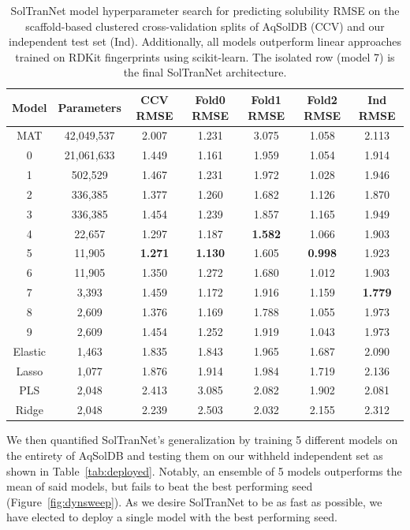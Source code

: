 \documentclass[journal=jmcmar,manuscript=article]{achemso}
\begin{document}
\begin{table}
    \begin{tabular}{|c|c|c|c|c|c|c|}
        \hline
         Model & Parameters & CCV RMSE & Fold0 RMSE & Fold1 RMSE & Fold2 RMSE & Ind RMSE \\
         \hline
         MAT & 42,049,537 & 2.007 & 1.231 & 3.075 & 1.058 & 2.113  \\
         \hline
         0 & 21,061,633 & 1.449 & 1.161 & 1.959 & 1.054 & 1.914 \\
         1 & 502,529 & 1.467 & 1.231 & 1.972 & 1.028 & 1.946 \\
         2 & 336,385 & 1.377 & 1.260 & 1.682 & 1.126 & 1.870 \\
         3 & 336,385 & 1.454 & 1.239 & 1.857 & 1.165 & 1.949 \\
         4 & 22,657 & 1.297 & 1.187 & \textbf{1.582} & 1.066 & 1.903 \\
         5 & 11,905 & \textbf{1.271} & \textbf{1.130} & 1.605 & \textbf{0.998} & 1.923 \\
         6 & 11,905 & 1.350 & 1.272 & 1.680 & 1.012 & 1.903\\ \hline \hline
         7 & 3,393 & 1.459 & 1.172 & 1.916 & 1.159 & \textbf{1.779}\\ \hline \hline
         8 & 2,609 & 1.376 & 1.169 & 1.788 & 1.055  & 1.973 \\
         9 & 2,609 & 1.454 & 1.252 & 1.919 & 1.043  & 1.973 \\
         \hline \hline
         Elastic & 1,463 & 1.835 & 1.843 & 1.965 & 1.687  & 2.090\\
         Lasso & 1,077 & 1.876 & 1.914 & 1.984 & 1.719 & 2.136\\
         PLS & 2,048 & 2.413 & 3.085 & 2.082 & 1.902 & 2.081\\
         Ridge & 2,048 & 2.239 & 2.503 & 2.032 & 2.155 & 2.312 \\
         \hline
    \end{tabular}
    \caption{SolTranNet model hyperparameter search for predicting solubility RMSE on the scaffold-based clustered cross-validation splits of AqSolDB (CCV) and our independent test set (Ind). Additionally, all models outperform linear approaches trained on RDKit fingerprints using scikit-learn\cite{scikit-learn}. The isolated row (model 7) is the final SolTranNet architecture.}
    \label{tab:solsearchrmse}
\end{table}

We then quantified SolTranNet's generalization by training 5 different models on the entirety of AqSolDB and testing them on our withheld independent set as shown in Table~\ref{tab:deployed}.
Notably, an ensemble of 5 models outperforms the mean of said models, but fails to beat the best performing seed (Figure~\ref{fig:dynsweep}).
As we desire SolTranNet to be as fast as possible, we have elected to deploy a single model with the best performing seed.
\end{document}
